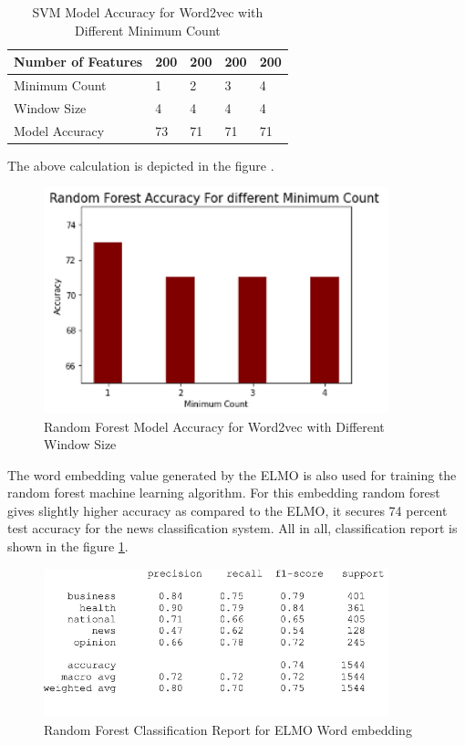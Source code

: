 \begin{center}
\begin{table}[H]
\caption{SVM Model Accuracy for Word2vec with Different Minimum Count}
\label{table:SVM_model_different_minimum_count}
\centering
\begin{tabular}{ |p{4cm}|p{2cm}|p{2cm}|p{2cm}|p{2cm}|  }
 \hline
 Number of Features & 200 &200 &200 &200  \\
 \hline
 Minimum Count   & 1 &2 &3 &4    \\
 \hline
 Window Size &4 &4 &4 &4 \\
 \hline
 Model Accuracy &73 &71 &71 &71 \\
 \hline
\end{tabular}
\end{table}
\end{center}
The above calculation is depicted in the figure .
\begin{figure}[H]
	\centering 
	\vspace{20pt}\includegraphics[width=10cm]{images/Random_forest_accuracy_for_different_minimum_count.png}
	\caption{Random Forest Model Accuracy for Word2vec with Different Window Size} 
	
\end{figure}
The word embedding value generated by the ELMO is also used for training the random forest machine learning algorithm. For this embedding random forest gives slightly higher accuracy as compared to the ELMO, it secures 74 percent test accuracy for the news classification system. All in all, classification report is shown in the figure \ref{fig:Random_forest_for_ELMo}.
\begin{figure}[H]
	\centering 
	\vspace{20pt}\includegraphics[width=10cm]{images/Random_forest_for_ELMO.png}
	\caption{Random Forest Classification Report for ELMO Word embedding} 
	\label{fig:Random_forest_for_ELMo}
\end{figure}
